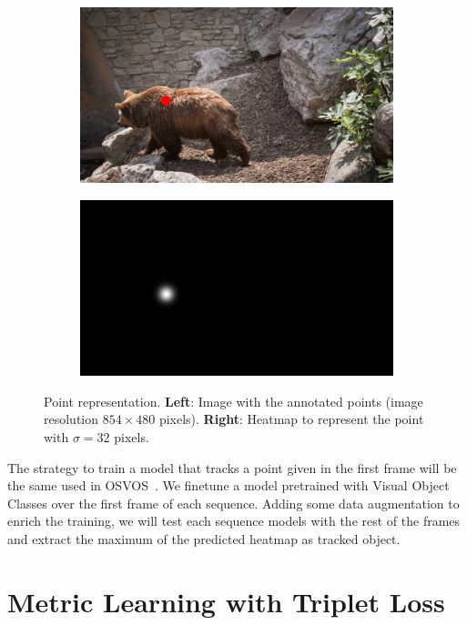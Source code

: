 \begin{figure}[h]
  \centering
  \begin{subfigure}{.5\textwidth}
    \centering
    \includegraphics[width=.8\linewidth]{figures/methods/heatmaps/image_point.png}
  \end{subfigure}%
  \begin{subfigure}{.5\textwidth}
    \centering
    \includegraphics[width=.8\linewidth]{figures/methods/heatmaps/heatmap.png}
  \end{subfigure}
  \caption{
  Point representation.
  \textbf{Left}: Image with the annotated points (image resolution $854 \times 480$ pixels).
  \textbf{Right}: Heatmap to represent the point with $\sigma = 32$ pixels. }
  \label{fig:point_representation}
\end{figure}

The strategy to train a model that tracks a point given in the first frame will be the same used in OSVOS~\osvos.
We finetune a model pretrained with Visual Object Classes over the first frame of each sequence.
Adding some data augmentation to enrich the training, we will test each sequence models with the rest of the frames and extract the maximum of the predicted heatmap as tracked object.

\section{Metric Learning with Triplet Loss}
\label{sec:methods_metriclearning}

